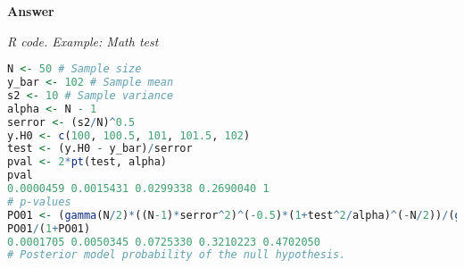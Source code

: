 \begin{enumerate}[leftmargin=*]
	\textbf{Answer}

\begin{tcolorbox}[enhanced,width=4.67in,center upper,
	fontupper=\large\bfseries,drop shadow southwest,sharp corners]
	\textit{R code. Example: Math test}
\begin{VF}
\begin{lstlisting}[language=R]
N <- 50 # Sample size
y_bar <- 102 # Sample mean 
s2 <- 10 # Sample variance
alpha <- N - 1
serror <- (s2/N)^0.5 
y.H0 <- c(100, 100.5, 101, 101.5, 102)
test <- (y.H0 - y_bar)/serror
pval <- 2*pt(test, alpha)
pval
0.0000459 0.0015431 0.0299338 0.2690040 1
# p-values
PO01 <- (gamma(N/2)*((N-1)*serror^2)^(-0.5)*(1+test^2/alpha)^(-N/2))/(gamma(1/2)*gamma((N-1)/2))
PO01/(1+PO01)
0.0001705 0.0050345 0.0725330 0.3210223 0.4702050
# Posterior model probability of the null hypothesis.
\end{lstlisting}
\end{VF}
\end{tcolorbox}

	
\end{enumerate}